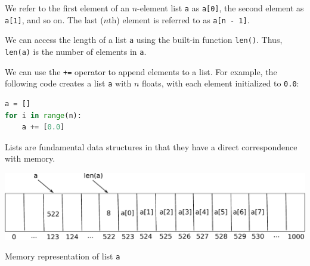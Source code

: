 \documentclass[8pt,a4paper,compress,handout]{beamer}
\begin{document}
\begin{frame}[fragile]
We refer to the first element of an $n$-element list \lstinline{a} as \lstinline{a[0]}, the second element as \lstinline{a[1]}, and so on. The last ($n$th) element is referred to as \lstinline{a[n - 1]}.

\bigskip

We can access the length of a list \lstinline{a} using the built-in function \lstinline{len()}. Thus, \lstinline{len(a)} is the number of elements in \lstinline{a}. 

\bigskip

We can use the \lstinline{+=} operator to append elements to a list. For example, the following code creates a list \lstinline{a} with $n$ floats, with each element initialized to \lstinline{0.0}:

\begin{lstlisting}[language=Python]
a = []
for i in range(n):
    a += [0.0]
\end{lstlisting} 

\bigskip


Lists are fundamental data structures in that they have a direct correspondence with memory. 

\begin{center}
\includegraphics[scale=0.4]{figures/list_rep.pdf}

\smallskip

\tiny Memory representation of list \lstinline{a}
\end{center}
\end{frame}
\end{document}
